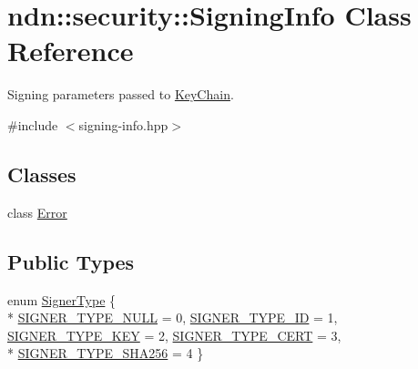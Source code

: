 \hypertarget{classndn_1_1security_1_1SigningInfo}{}\section{ndn\+:\+:security\+:\+:Signing\+Info Class Reference}
\label{classndn_1_1security_1_1SigningInfo}


Signing parameters passed to \hyperlink{classndn_1_1security_1_1KeyChain}{Key\+Chain}.  




{\ttfamily \#include $<$signing-\/info.\+hpp$>$}

\subsection*{Classes}
\begin{DoxyCompactItemize}
\item 
class \hyperlink{classndn_1_1security_1_1SigningInfo_1_1Error}{Error}
\end{DoxyCompactItemize}
\subsection*{Public Types}
\begin{DoxyCompactItemize}
\item 
enum \hyperlink{classndn_1_1security_1_1SigningInfo_aae7126c0334e630976d1efbaae3c0102}{Signer\+Type} \{ \\*
\hyperlink{classndn_1_1security_1_1SigningInfo_aae7126c0334e630976d1efbaae3c0102a9b67fe6a8d2d05ebfd00f7dc8d0e5709}{S\+I\+G\+N\+E\+R\+\_\+\+T\+Y\+P\+E\+\_\+\+N\+U\+LL} = 0, 
\hyperlink{classndn_1_1security_1_1SigningInfo_aae7126c0334e630976d1efbaae3c0102ac7709f4ed71986b8db05fd5318d8fccd}{S\+I\+G\+N\+E\+R\+\_\+\+T\+Y\+P\+E\+\_\+\+ID} = 1, 
\hyperlink{classndn_1_1security_1_1SigningInfo_aae7126c0334e630976d1efbaae3c0102aef462253f9ae22d4972c0d388bbabae9}{S\+I\+G\+N\+E\+R\+\_\+\+T\+Y\+P\+E\+\_\+\+K\+EY} = 2, 
\hyperlink{classndn_1_1security_1_1SigningInfo_aae7126c0334e630976d1efbaae3c0102a3b5e11acb90aee302a82d1a80074da8f}{S\+I\+G\+N\+E\+R\+\_\+\+T\+Y\+P\+E\+\_\+\+C\+E\+RT} = 3, 
\\*
\hyperlink{classndn_1_1security_1_1SigningInfo_aae7126c0334e630976d1efbaae3c0102a6e48700d048b1d8a7853ac1d1ce20f56}{S\+I\+G\+N\+E\+R\+\_\+\+T\+Y\+P\+E\+\_\+\+S\+H\+A256} = 4
 \}
\end{DoxyCompactItemize}
